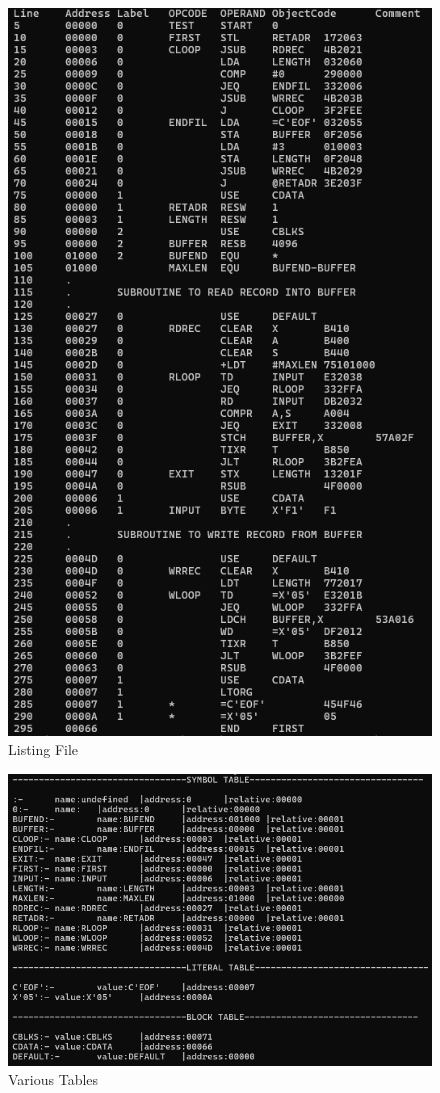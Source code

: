 \documentclass[
]{article}
\begin{document}
\begin{enumerate}
\begin{figure}[H]
\centering
\includegraphics{img/image-6.png}
\caption{Listing File}
\end{figure}

\begin{figure}[H]
\centering
\includegraphics{img/image-7.png}
\caption{Various Tables}
\end{figure}


\end{enumerate}
\end{document}

